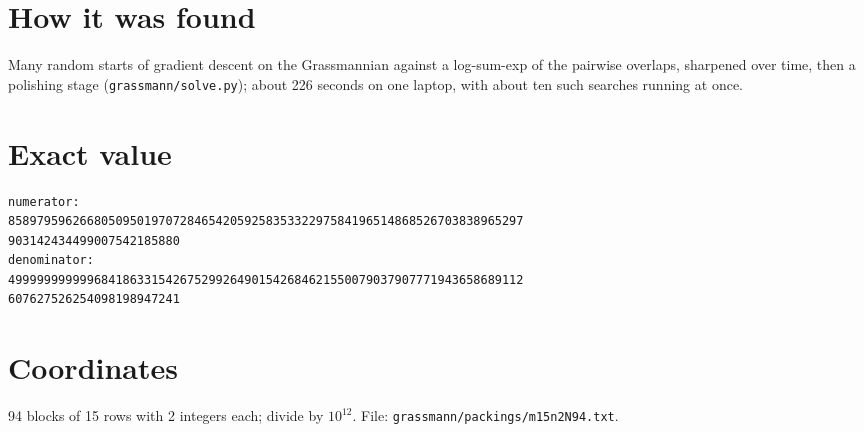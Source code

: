 \documentclass[11pt,a4paper]{article}
\begin{document}
\section{How it was found}
Many random starts of gradient descent on the Grassmannian against a log-sum-exp of the pairwise overlaps, sharpened over time, then a polishing stage (\texttt{grassmann/solve.py}); about 226 seconds on one laptop, with about ten such searches running at once.


\appendix
\section{Exact value}
{\small
\begin{verbatim}
numerator:
858979596266805095019707284654205925835332297584196514868526703838965297
903142434499007542185880
denominator:
499999999999684186331542675299264901542684621550079037907771943658689112
607627526254098198947241
\end{verbatim}}

\section{Coordinates}
94 blocks of 15 rows with 2 integers each; divide by $10^{12}$. File: \texttt{grassmann/packings/m15n2N94.txt}.
{\tiny
\begin{multicols}{4}
\end{multicols}}
\end{document}
